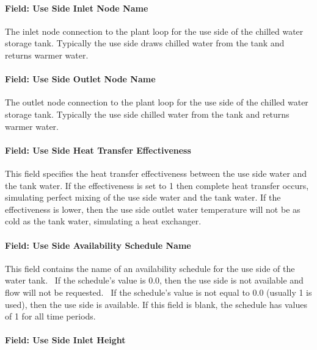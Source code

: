 \paragraph{Field: Use Side Inlet Node Name}\label{field-use-side-inlet-node-name-1}

The inlet node connection to the plant loop for the use side of the chilled water storage tank. Typically the use side draws chilled water from the tank and returns warmer water.

\paragraph{Field: Use Side Outlet Node Name}\label{field-use-side-outlet-node-name-1}

The outlet node connection to the plant loop for the use side of the chilled water storage tank. Typically the use side chilled water from the tank and returns warmer water.

\paragraph{Field: Use Side Heat Transfer Effectiveness}\label{field-use-side-heat-transfer-effectiveness-1}

This field specifies the heat transfer effectiveness between the use side water and the tank water. If the effectiveness is set to 1 then complete heat transfer occurs, simulating perfect mixing of the use side water and the tank water. If the effectiveness is lower, then the use side outlet water temperature will not be as cold as the tank water, simulating a heat exchanger.

\paragraph{Field: Use Side Availability Schedule Name}\label{field-use-side-availability-schedule-name-1}

This field contains the name of an availability schedule for the use side of the water tank.~ If the schedule's value is 0.0, then the use side is not available and flow will not be requested.~ If the schedule's value is not equal to 0.0 (usually 1 is used), then the use side is available. If this field is blank, the schedule has values of 1 for all time periods.

\paragraph{Field: Use Side Inlet Height}\label{field-use-side-inlet-height}

